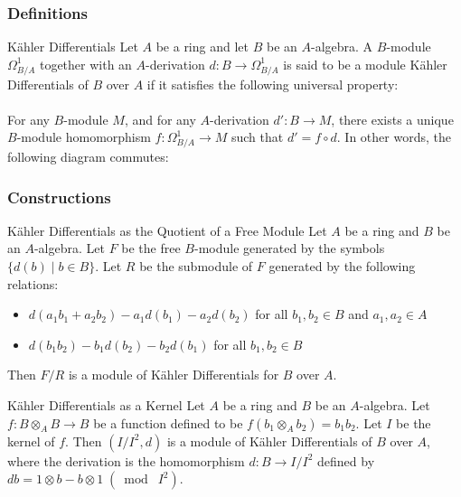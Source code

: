 \documentclass[10pt]{beamer}
\begin{document}
\begin{frame}[fragile]
\frametitle{Definitions}

\begin{block}{Kähler Differentials} Let $A$ be a ring and let $B$ be an $A$-algebra. A $B$-module $\Omega_{B/A}^1$ together with an $A$-derivation $d:B\to\Omega_{B/A}^1$ is said to be a module Kähler Differentials of $B$ over $A$ if it satisfies the following universal property: \\~\\
For any $B$-module $M$, and for any $A$-derivation $d':B\to M$, there exists a unique $B$-module homomorphism $f:\Omega_{B/A}^1\to M$ such that $d'=f\circ d$. In other words, the following diagram commutes: \\
\end{block}
\end{frame}

\begin{frame}[fragile]
\frametitle{Constructions}

\begin{block}{Kähler Differentials as the Quotient of a Free Module} Let $A$ be a ring and $B$ be an $A$-algebra. Let $F$ be the free $B$-module generated by the symbols $\{d(b)\;|\;b\in B\}$. Let $R$ be the submodule of $F$ generated by the following relations: 
\begin{itemize}
\item $d(a_1b_1+a_2b_2)-a_1d(b_1)-a_2d(b_2)$ for all $b_1,b_2\in B$ and $a_1,a_2\in A$
\item $d(b_1b_2)-b_1d(b_2)-b_2d(b_1)$ for all $b_1,b_2\in B$
\end{itemize}
Then $F/R$ is a module of Kähler Differentials for $B$ over $A$. 
\end{block}

\begin{block}{Kähler Differentials as a Kernel} Let $A$ be a ring and $B$ be an $A$-algebra. Let $f:B\otimes_A B\to B$ be a function defined to be $f(b_1\otimes_A b_2)=b_1b_2$. Let $I$ be the kernel of $f$. Then $(I/I^2,d)$ is a module of Kähler Differentials of $B$ over $A$, where the derivation is the homomorphism $d:B\to I/I^2$ defined by $db=1\otimes b-b\otimes1\;(\bmod\;I^2)$. 
\end{block}
\end{frame}
\end{document}
